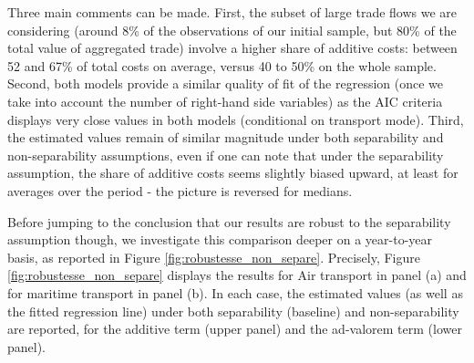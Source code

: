 \documentclass[a4paper,11pt]{article}
\begin{document}
Three main comments can be made. First, the subset of large trade flows we are considering (around 8\% of the observations of our initial sample, but 80\% of the total value of aggregated trade) involve a higher share of additive costs: between 52 and 67\% of total costs on average, versus 40 to 50\% on the whole sample.
Second, both models provide a similar quality of fit of the regression (once we take into account the number of right-hand side variables) as the AIC criteria displays very close values in both models (conditional on transport mode).
Third, the estimated values remain of similar magnitude under both separability and non-separability assumptions, even if one can note that under the separability assumption, the share of additive costs seems slightly biased upward, at least for averages over the period - the picture is reversed for medians.


Before jumping to the conclusion that our results are robust to the separability assumption though, we investigate this comparison deeper on a year-to-year basis, as reported in Figure \ref{fig:robustesse_non_separe}. Precisely, Figure \ref{fig:robustesse_non_separe} displays the results for Air transport in panel (a) and for maritime transport in panel (b). In each case, the estimated values (as well as the fitted regression line) under both separability (baseline) and non-separability are reported, for the additive term (upper panel) and the ad-valorem term (lower panel).
\end{document}

